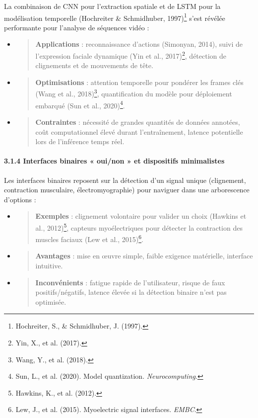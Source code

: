 \documentclass[
]{article}
\begin{document}
La combinaison de CNN pour l'extraction spatiale et de LSTM pour la modélisation temporelle (Hochreiter \& Schmidhuber, 1997)\footnote{Hochreiter, S., \& Schmidhuber, J. (1997).} s'est révélée performante pour l'analyse de séquences vidéo :

\begin{itemize}
\item
  \begin{quote}
  \textbf{Applications} : reconnaissance d'actions (Simonyan, 2014), suivi de l'expression faciale dynamique (Yin et al., 2017)\footnote{Yin, X., et al. (2017).}, détection de clignements et de mouvements de tête.
  \end{quote}
\item
  \begin{quote}
  \textbf{Optimisations} : attention temporelle pour pondérer les frames clés (Wang et al., 2018)\footnote{Wang, Y., et al. (2018).}, quantification du modèle pour déploiement embarqué (Sun et al., 2020)\footnote{Sun, L., et al. (2020). Model quantization. \emph{Neurocomputing}.}.
  \end{quote}
\item
  \begin{quote}
  \textbf{Contraintes} : nécessité de grandes quantités de données annotées, coût computationnel élevé durant l'entraînement, latence potentielle lors de l'inférence temps réel.
  \end{quote}
\end{itemize}

\hypertarget{interfaces-binaires-ouinon-et-dispositifs-minimalistes}{%
\paragraph{3.1.4 Interfaces binaires « oui/non » et dispositifs minimalistes}\label{interfaces-binaires-ouinon-et-dispositifs-minimalistes}}

Les interfaces binaires reposent sur la détection d'un signal unique (clignement, contraction musculaire, électromyographie) pour naviguer dans une arborescence d'options :

\begin{itemize}
\item
  \begin{quote}
  \textbf{Exemples} : clignement volontaire pour valider un choix (Hawkins et al., 2012)\footnote{Hawkins, K., et al. (2012).}, capteurs myoélectriques pour détecter la contraction des muscles faciaux (Lew et al., 2015)\footnote{Lew, J., et al. (2015). Myoelectric signal interfaces. \emph{EMBC}.}.
  \end{quote}
\item
  \begin{quote}
  \textbf{Avantages} : mise en œuvre simple, faible exigence matérielle, interface intuitive.
  \end{quote}
\item
  \begin{quote}
  \textbf{Inconvénients} : fatigue rapide de l'utilisateur, risque de faux positifs/négatifs, latence élevée si la détection binaire n'est pas optimisée.
  \end{quote}
\end{itemize}
\end{document}
